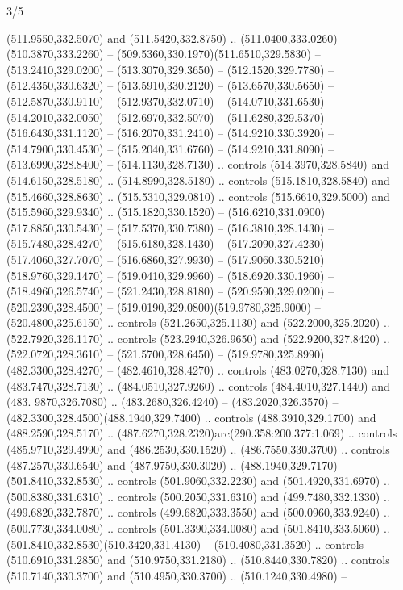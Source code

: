\begin{flagdescription}{3/5}
\begin{scope}[shift={(0.5\flaglength,0.5\flagwidth)},scale=\flagwidth/1075]
\begin{scope}[y=0.80pt, x=0.80pt, yscale=-2.37, xscale=2.37,xshift=-402,yshift=-230.4]
  (511.9550,332.5070) and (511.5420,332.8750) .. (511.0400,333.0260) --
  (510.3870,333.2260) -- (509.5360,330.1970)(511.6510,329.5830) --
  (513.2410,329.0200) -- (513.3070,329.3650) -- (512.1520,329.7780) --
  (512.4350,330.6320) -- (513.5910,330.2120) -- (513.6570,330.5650) --
  (512.5870,330.9110) -- (512.9370,332.0710) -- (514.0710,331.6530) --
  (514.2010,332.0050) -- (512.6970,332.5070) --
  (511.6280,329.5370)(516.6430,331.1120) -- (516.2070,331.2410) --
  (514.9210,330.3920) -- (514.7900,330.4530) -- (515.2040,331.6760) --
  (514.9210,331.8090) -- (513.6990,328.8400) -- (514.1130,328.7130) .. controls
  (514.3970,328.5840) and (514.6150,328.5180) .. (514.8990,328.5180) .. controls
  (515.1810,328.5840) and (515.4660,328.8630) .. (515.5310,329.0810) .. controls
  (515.6610,329.5000) and (515.5960,329.9340) .. (515.1820,330.1520) --
  (516.6210,331.0900)(517.8850,330.5430) -- (517.5370,330.7380) --
  (516.3810,328.1430) -- (515.7480,328.4270) -- (515.6180,328.1430) --
  (517.2090,327.4230) -- (517.4060,327.7070) -- (516.6860,327.9930) --
  (517.9060,330.5210)(518.9760,329.1470) -- (519.0410,329.9960) --
  (518.6920,330.1960) -- (518.4960,326.5740) -- (521.2430,328.8180) --
  (520.9590,329.0200) -- (520.2390,328.4500) --
  (519.0190,329.0800)(519.9780,325.9000) -- (520.4800,325.6150) .. controls
  (521.2650,325.1130) and (522.2000,325.2020) .. (522.7920,326.1170) .. controls
  (523.2940,326.9650) and (522.9200,327.8420) .. (522.0720,328.3610) --
  (521.5700,328.6450) -- (519.9780,325.8990)
  (482.3300,328.4270) -- (482.4610,328.4270) .. controls
  (483.0270,328.7130) and (483.7470,328.7130) .. (484.0510,327.9260) .. controls
  (484.4010,327.1440) and (483. 9870,326.7080) .. (483.2680,326.4240) --
  (483.2020,326.3570) -- (482.3300,328.4500)(488.1940,329.7400) .. controls
  (488.3910,329.1700) and (488.2590,328.5170) ..
  (487.6270,328.2320)arc(290.358:200.377:1.069) .. controls (485.9710,329.4990)
  and (486.2530,330.1520) .. (486.7550,330.3700) .. controls (487.2570,330.6540)
  and (487.9750,330.3020) .. (488.1940,329.7170)(501.8410,332.8530) .. controls
  (501.9060,332.2230) and (501.4920,331.6970) .. (500.8380,331.6310) .. controls
  (500.2050,331.6310) and (499.7480,332.1330) .. (499.6820,332.7870) .. controls
  (499.6820,333.3550) and (500.0960,333.9240) .. (500.7730,334.0080) .. controls
  (501.3390,334.0080) and (501.8410,333.5060) ..
  (501.8410,332.8530)(510.3420,331.4130) -- (510.4080,331.3520) .. controls
  (510.6910,331.2850) and (510.9750,331.2180) .. (510.8440,330.7820) .. controls
  (510.7140,330.3700) and (510.4950,330.3700) .. (510.1240,330.4980) --

\end{scope}
\end{scope}
\end{flagdescription}
